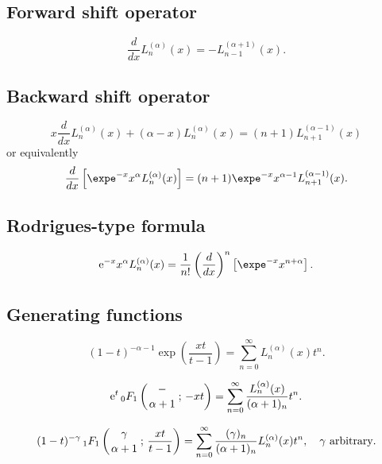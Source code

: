 \documentclass[envcountchap,graybox]{svmono}
\newcommand{\hyp}[5]{\mbox{}_{#1}{F}_{#2}
\left(\genfrac{}{}{0pt}{}{#3}{#4}\,;\,#5\right)}
\newcommand{\e}{\textrm{e}}
\newcommand{\hyp}[5]{\,\mbox{}_{#1}F_{#2}\!\left(
  \genfrac{}{}{0pt}{}{#3}{#4};#5\right)}
\begin{document}
\newpage

\subsection*{Forward shift operator}
\begin{equation}
\label{shift1Laguerre}
\frac{d}{dx}L_n^{(\alpha)}(x)=-L_{n-1}^{(\alpha+1)}(x).
\end{equation}

\subsection*{Backward shift operator}
\begin{equation}
\label{shift2LaguerreI}
x\frac{d}{dx}L_n^{(\alpha)}(x)+(\alpha-x)L_n^{(\alpha)}(x)=(n+1)L_{n+1}^{(\alpha-1)}(x)
\end{equation}
or equivalently
\begin{equation}
\label{shift2LaguerreII}
\frac{d}{dx}\left[\expe^{-x}x^{\alpha}L_n^{(\alpha)}(x)\right]=(n+1)\expe^{-x}x^{\alpha-1}L^{(\alpha-1)}_{n+1}(x).
\end{equation}

\subsection*{Rodrigues-type formula}
\begin{equation}
\label{RodLaguerre}
\e^{-x}x^{\alpha}L_n^{(\alpha)}(x)=\frac{1}{n!}\left(\frac{d}{dx}\right)^n\left[\expe^{-x}x^{n+\alpha}\right].
\end{equation}

\subsection*{Generating functions}
\begin{equation}
\label{GenLaguerre1}
(1-t)^{-\alpha-1}\exp\left(\frac{xt}{t-1}\right)=
\sum_{n=0}^{\infty}L_n^{(\alpha)}(x)t^n.
\end{equation}

\begin{equation}
\label{GenLaguerre2}
\e^t\,\hyp{0}{1}{-}{\alpha+1}{-xt}
=\sum_{n=0}^{\infty}\frac{L_n^{(\alpha)}(x)}{(\alpha+1)_n}t^n.
\end{equation}

\begin{equation}
\label{GenLaguerre3}
(1-t)^{-\gamma}\,\hyp{1}{1}{\gamma}{\alpha+1}{\frac{xt}{t-1}}
=\sum_{n=0}^{\infty}\frac{(\gamma)_n}{(\alpha+1)_n}L_n^{(\alpha)}(x)t^n,
\quad\textrm{$\gamma$ arbitrary}.
\end{equation}
\end{document}
